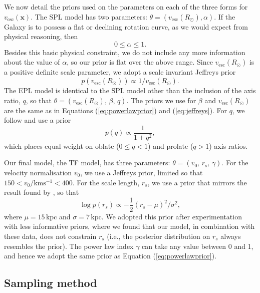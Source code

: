 \documentclass[useAMS,twocolumn,usenatbib]{mn2e}
\def\kpc{{\,\mathrm{kpc}}}
\def\vesc{{v_\mathrm{esc}}}
\def\pos{{\boldsymbol{x}}}
\begin{document}
We now detail the priors used on the parameters on each of the three forms for $\vesc(\pos)$.
The SPL model has two parameters: $\theta = (\vesc(R_\odot),\alpha)$. 
If the Galaxy is to possess a flat or declining rotation curve, as we would expect from physical reasoning, then
%
\begin{equation}
0 \leq \alpha \leq 1.
\label{eq:powerlawprior}
\end{equation}
%
Besides this basic physical constraint, we do not include any more information about the value of $\alpha$, so our prior is flat over the above range. 
Since $\vesc(R_\odot)$ is a positive definite scale parameter, we adopt a scale invariant Jeffreys prior
%
\begin{equation}
p\left(\vesc(R_\odot)\right) \propto 1/\vesc(R_\odot).
\label{eq:jeffreys}
\end{equation}
%
The EPL model is identical to the SPL model other than the inclusion of the axis ratio, $q$, so that $\theta = (\vesc(R_\odot),\,\beta,\,q)$. 
The priors we use for $\beta$ and $\vesc(R_\odot)$ are the same as in Equations (\ref{eq:powerlawprior}) and (\ref{eq:jeffreys}). For $q$, we follow \citet{Bo16} and use a prior
%
\begin{equation}
p(q) \propto \dfrac{1}{1+q^2},
\end{equation}
%
which places equal weight on oblate ($0\leq q <1$) and prolate ($q>1$) axis ratios.

Our final model, the TF model, has three parameters: $\theta = (v_0,\,r_s,\,\gamma)$. 
For the velocity normalisation $v_0$, we use a Jeffreys prior, limited so that $150 < v_0/\mathrm{kms^{-1}} < 400$. 
For the scale length, $r_s$, we use a prior that mirrors the result found by \citet{Gi14}, so that
%
\begin{equation}
\log p(r_s) \propto -\dfrac{1}{2}(r_s - \mu)^2 / \sigma^2,
\end{equation}
% 
where $\mu=15\kpc$ and $\sigma=7\kpc$. 
We adopted this prior after experimentation with less informative priors, where we found that our model, in combination with these data, does not constrain $r_s$ (i.e., the posterior distribution on $r_s$ always resembles the prior).
The power law index $\gamma$ can take any value between 0 and 1, and hence we adopt the same prior as Equation (\ref{eq:powerlawprior}).

\subsection{Sampling method}
\label{sec:sampling_method}
\end{document}
